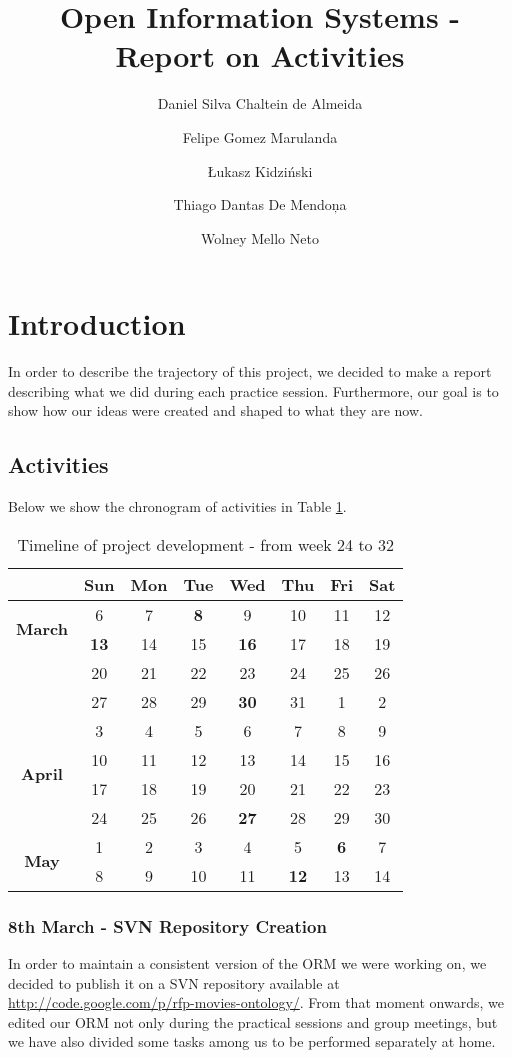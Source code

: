 \documentclass[a4paper,10pt]{article}
\title{Open Information Systems - Report on Activities}
\author{Daniel Silva Chaltein de Almeida
\and Felipe Gomez Marulanda
\and \L{}ukasz Kidzi\'nski
\and Thiago Dantas De Mendon\c{}a
\and Wolney Mello Neto}
\begin{document}
\maketitle

\section{Introduction}
In order to describe the trajectory of this project, we decided to make a report describing what we did during each practice session. Furthermore, our goal is to show how our ideas were created and shaped to what they are now.

\subsection{Activities}
Below we show the chronogram of activities in Table \ref{tab:timeline}.

\begin{table}[!h]
  \centering
  \caption{Timeline of project development - from week 24 to 32}
  \begin{tabular}{|c|c|c|c|c|c|c|c|}
    \hline
    & \textbf{Sun} & \textbf{Mon} & \textbf{Tue} & \textbf{Wed} & \textbf{Thu} & \textbf{Fri} & \textbf{Sat} \\ \hline
    \multirow{2}{*}{\textbf{March}}
    & 6 & 7 & \textbf{8} & 9 & 10 & 11 & 12 \\ \cline{2-8}
    & \textbf{13} & 14 & 15 & \textbf{16} & 17 & 18 & 19 \\ \cline{2-8}
    & 20 & 21 & 22 & 23 & 24 & 25 & 26 \\ \cline{2-8}
    & 27 & 28 & 29 & \textbf{30} & 31 & 1 & 2 \\ \hline
    \multirow{4}{*}{\textbf{April}}
    & 3 & 4 & 5 & 6 & 7 & 8 & 9  \\ \cline{2-8}
    & 10 & 11 & 12 & 13 & 14 & 15 & 16 \\ \cline{2-8}
    & 17 & 18 & 19 & 20 & 21 & 22 & 23 \\ \cline{2-8}
    & 24 & 25 & 26 & \textbf{27} & 28 & 29 & 30 \\ \hline
    \multirow{2}{*}{\textbf{May}}
    & 1 & 2 & 3 & 4 & 5 & \textbf{6} & 7 \\ \cline{2-8}
    & 8 & 9 & 10 & 11 & \textbf{12} & 13 & 14 \\ \hline
  \end{tabular}
  \label{tab:timeline}
\end{table}

\subsubsection*{8th March - SVN Repository Creation}
In order to maintain a consistent version of the ORM we were working on, we decided to publish it on a SVN repository available at \href{http://code.google.com/p/rfp-movies-ontology/}{http://code.google.com/p/rfp-movies-ontology/}. From that moment onwards, we edited our ORM not only during the practical sessions and group meetings, but we have also divided some tasks among us to be performed separately at home.
\end{document}
